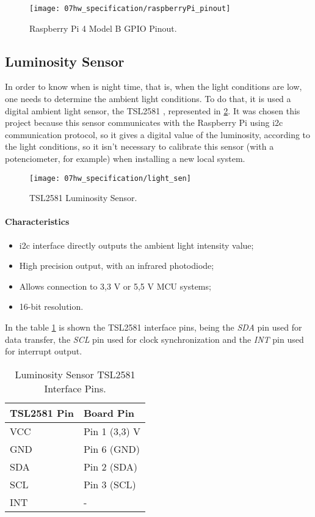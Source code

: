 \begin{figure}[ht]
	\centering
	\texttt{[image: 07hw\_specification/raspberryPi\_pinout]}
	\caption{Raspberry Pi 4 Model B GPIO Pinout.}
	\label{fig:rasp_pinout}
\end{figure}

\subsection{Luminosity Sensor}

In order to know when is night time, that is, when the light conditions are low, one needs to determine the ambient light conditions. To do that, it is used a digital ambient light sensor, the TSL2581 \cite{light_sensor}, represented in \ref{fig:light_sen}. It was chosen this project because this sensor communicates with the Raspberry Pi using \ac{i2c} communication protocol, so it gives a digital value of the luminosity, according to the light conditions, so it isn't necessary to calibrate this sensor (with a potenciometer, for example) when installing a new local system.

\begin{figure}[H]
	\centering
	\texttt{[image: 07hw\_specification/light\_sen]}
	\caption{TSL2581 Luminosity Sensor.}
	\label{fig:light_sen}
\end{figure}

\paragraph*{Characteristics}
\begin{itemize}
	\item \ac{i2c} interface directly outputs the ambient light intensity value;
	\item High precision output, with an infrared photodiode;
	\item Allows connection to 3,3 V or 5,5 V MCU systems;
	\item 16-bit resolution.
\end{itemize}

In the table \ref{table:light_sen} is shown the TSL2581 interface pins, being the \textit{SDA} pin used for data transfer, the \textit{SCL} pin used for clock synchronization and the \textit{INT} pin used for interrupt output. 

\begin{table}[H]
	\centering
	\begin{tabular}{|m{5cm}|m{6cm}|}
		\hline
		\textbf{TSL2581 Pin} & \textbf{Board Pin}\\\hline\hline
		VCC & Pin 1 (3,3) V\\\hline
		GND & Pin 6 (GND)\\\hline
		SDA & Pin 2 (SDA)\\\hline
		SCL & Pin 3 (SCL)\\\hline
		INT & -\\
		\hline
	\end{tabular}		
	
	\caption{Luminosity Sensor TSL2581 Interface Pins.}
	\label{table:light_sen}
\end{table}


